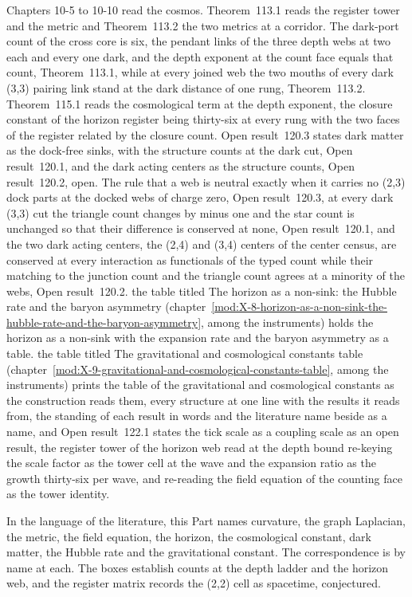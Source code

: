Chapters 10-5 to 10-10 read the cosmos. Theorem~113.1 reads the register tower and the metric and Theorem~113.2 the two metrics at a corridor. The dark-port count of the cross core is six, the pendant links of the three depth webs at two each and every one dark, and the depth exponent at the count face equals that count, Theorem~113.1, while at every joined web the two mouths of every dark (3,3) pairing link stand at the dark distance of one rung, Theorem~113.2. Theorem~115.1 reads the cosmological term at the depth exponent, the closure constant of the horizon register being thirty-six at every rung with the two faces of the register related by the closure count. Open result~120.3 states dark matter as the dock-free sinks, with the structure counts at the dark cut, Open result~120.1, and the dark acting centers as the structure counts, Open result~120.2, open. The rule that a web is neutral exactly when it carries no (2,3) dock parts at the docked webs of charge zero, Open result~120.3, at every dark (3,3) cut the triangle count changes by minus one and the star count is unchanged so that their difference is conserved at none, Open result~120.1, and the two dark acting centers, the (2,4) and (3,4) centers of the center census, are conserved at every interaction as functionals of the typed count while their matching to the junction count and the triangle count agrees at a minority of the webs, Open result~120.2. the table titled The horizon as a non-sink: the Hubble rate and the baryon asymmetry (chapter~\ref{mod:X-8-horizon-as-a-non-sink-the-hubble-rate-and-the-baryon-asymmetry}, among the instruments) holds the horizon as a non-sink with the expansion rate and the baryon asymmetry as a table. the table titled The gravitational and cosmological constants table (chapter~\ref{mod:X-9-gravitational-and-cosmological-constants-table}, among the instruments) prints the table of the gravitational and cosmological constants as the construction reads them, every structure at one line with the results it reads from, the standing of each result in words and the literature name beside as a name, and Open result~122.1 states the tick scale as a coupling scale as an open result, the register tower of the horizon web read at the depth bound re-keying the scale factor as the tower cell at the wave and the expansion ratio as the growth thirty-six per wave, and re-reading the field equation of the counting face as the tower identity.

In the language of the literature, this Part names curvature, the graph Laplacian, the metric, the field equation, the horizon, the cosmological constant, dark matter, the Hubble rate and the gravitational constant. The correspondence is by name at each. The boxes establish counts at the depth ladder and the horizon web, and the register matrix records the (2,2) cell as spacetime, conjectured.

